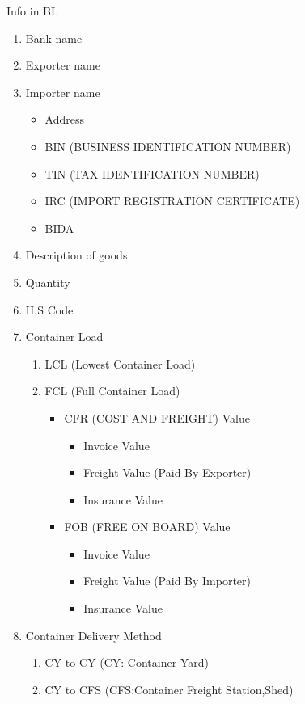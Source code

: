 \documentclass[10pt]{article}
\begin{document}
\begin{enumerate}
\begin{description}
    \item [Info in BL]
\end{description}
\begin{enumerate}
    \item Bank name
    \item Exporter name 
    \item Importer name 
\begin{itemize}
        \item Address
        \item BIN (BUSINESS IDENTIFICATION NUMBER)
        \item TIN (TAX IDENTIFICATION NUMBER)
        \item IRC (IMPORT REGISTRATION CERTIFICATE)
        \item BIDA
\end{itemize}
        \item Description of goods
        \item Quantity
        \item H.S Code
        \item Container Load
\begin{enumerate}
        \item LCL (Lowest Container Load)
        \item FCL (Full Container Load)
\begin{itemize}
    \item CFR (COST AND FREIGHT) Value
\begin{itemize}
        \item Invoice Value
        \item Freight Value (Paid By Exporter)
        \item Insurance Value
\end{itemize}
        \item FOB (FREE ON BOARD) Value
\begin{itemize}
        \item Invoice Value
        \item Freight Value (Paid By Importer)
        \item Insurance Value
\end{itemize}
\end{itemize}
\end{enumerate}
        \item Container Delivery Method
\begin{enumerate}
        \item CY to CY (CY: Container Yard)
        \item CY to CFS (CFS:Container Freight Station,Shed)

\end{enumerate}
\end{enumerate}
\end{enumerate}
\end{document}
